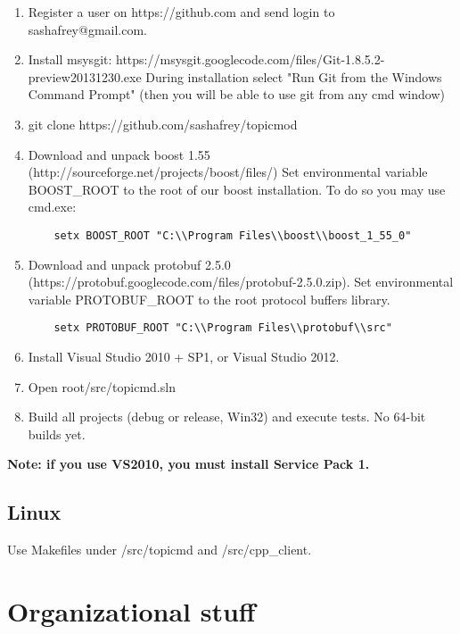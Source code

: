 \documentclass[11pt,a4paper,twoside]{report}
\begin{document}
\begin{enumerate}
\item Register a user on https://github.com and send login to sashafrey@gmail.com.
\item Install msysgit:
	https://msysgit.googlecode.com/files/Git-1.8.5.2-preview20131230.exe
   During installation select "Run Git from the Windows Command Prompt"
   (then you will be able to use git from any cmd window)
\item git clone https://github.com/sashafrey/topicmod
\item Download and unpack boost 1.55 (http://sourceforge.net/projects/boost/files/)
   Set environmental variable BOOST\_ROOT to the root of our boost installation. To do so you may use cmd.exe:
 \begin{verbatim}
 	setx BOOST_ROOT "C:\\Program Files\\boost\\boost_1_55_0"
 \end{verbatim}
\item Download and unpack protobuf 2.5.0 (https://protobuf.googlecode.com/files/protobuf-2.5.0.zip).
   Set environmental variable PROTOBUF\_ROOT to the root protocol buffers library.
  \begin{verbatim} 
	setx PROTOBUF_ROOT "C:\\Program Files\\protobuf\\src"
  \end{verbatim}
\item Install Visual Studio 2010 + SP1, or Visual Studio 2012.
\item Open root/src/topicmd.sln
\item Build all projects (debug or release, Win32) and execute tests. No 64-bit builds yet. 
\end{enumerate}


{\bf Note: if you use VS2010, you must install Service Pack 1.}

\subsection{Linux}

Use Makefiles under /src/topicmd and /src/cpp\_client.

\section{Organizational stuff}
\end{document}
